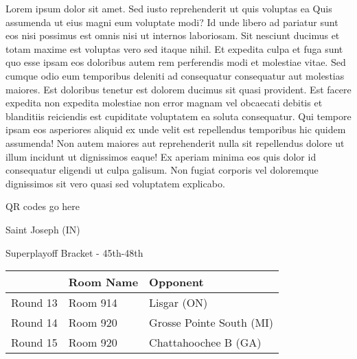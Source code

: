 \documentclass{article}%
\begin{document}
\vspace*{8pt}%
\linebreak%
\newline%
\newline%
Lorem ipsum dolor sit amet. Sed iusto reprehenderit ut quis voluptas ea Quis assumenda ut eius magni eum voluptate modi? Id unde libero ad pariatur sunt eos nisi possimus est omnis nisi ut internos laboriosam. Sit nesciunt ducimus et totam maxime est voluptas vero sed itaque nihil. Et expedita culpa et fuga sunt quo esse ipsam eos doloribus autem rem perferendis modi et molestiae vitae.\newline%
\newline%
Sed cumque odio eum temporibus deleniti ad consequatur consequatur aut molestias maiores. Est doloribus tenetur est dolorem ducimus sit quasi provident. Est facere expedita non expedita molestiae non error magnam vel obcaecati debitis et blanditiis reiciendis est cupiditate voluptatem ea soluta consequatur. Qui tempore ipsam eos asperiores aliquid ex unde velit est repellendus temporibus hic quidem assumenda!\newline%
\newline%
Non autem maiores aut reprehenderit nulla sit repellendus dolore ut illum incidunt ut dignissimos eaque! Ex aperiam minima eos quis dolor id consequatur eligendi ut culpa galisum. Non fugiat corporis vel doloremque dignissimos sit vero quasi sed voluptatem explicabo.\newline%
\newline%
%
\vspace*{30pt}%
\begin{center}%
\begin{Huge}%
QR codes go here%
\end{Huge}%
\end{center}%
\newpage%
\begin{center}%
\begin{Huge}%
Saint Joseph (IN)%
\end{Huge}%
\vspace*{8pt}%
\linebreak%
\begin{Large}%
Superplayoff Bracket {-} 45th{-}48th%
\end{Large}%
\end{center}%
%
\begin{tabularx}{\textwidth}{|c|Y|Y|}%
\hline%
&Room Name&Opponent\\%
\hline%
Round 13&Room 914&Lisgar (ON)\\%
Round 14&Room 920&Grosse Pointe South (MI)\\%
Round 15&Room 920&Chattahoochee B (GA)\\%
\hline%
\end{tabularx}%
\end{document}
